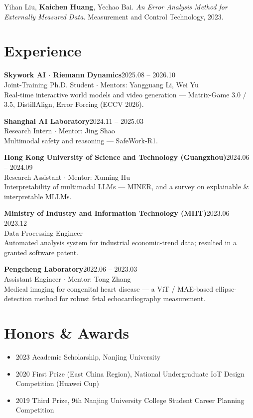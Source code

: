 \documentclass[11pt]{article}
\newcommand{\me}{\textbf{Kaichen Huang}}
\newcommand{\dt}[1]{\hfill{\color{inkIII}\footnotesize #1}}
\newcommand{\entry}[4]{%
  \textbf{\color{ink}#1}\dt{#2}\\[1pt]
  {\color{inkII}\small #3}\\[1pt]
  {\color{inkII}\small #4}\par\vspace{5pt}}
\newcounter{pubc}
\newcommand{\pub}[3]{%
  \stepcounter{pubc}%
  \noindent[\arabic{pubc}]\hspace{4pt}\begingroup\small
  #1. \textit{#2}. {\color{venue}#3}.\endgroup\par\vspace{4pt}}
\begin{document}
\pub{Yihan Liu, \me, Yechao Bai}{An Error Analysis Method for Externally Measured Data}{Measurement and Control Technology, 2023}

\section*{Experience}
\entry{Skywork AI \normalfont$\cdot$ Riemann Dynamics}{2025.08 -- 2026.10}
{Joint-Training Ph.D. Student \textcolor{inkIII}{$\cdot$} Mentors: Yangguang Li, Wei Yu}
{Real-time interactive world models and video generation --- Matrix-Game 3.0 / 3.5, DistillAlign, Error Forcing (ECCV 2026).}

\entry{Shanghai AI Laboratory}{2024.11 -- 2025.03}
{Research Intern \textcolor{inkIII}{$\cdot$} Mentor: Jing Shao}
{Multimodal safety and reasoning --- SafeWork-R1.}

\entry{Hong Kong University of Science and Technology (Guangzhou)}{2024.06 -- 2024.09}
{Research Assistant \textcolor{inkIII}{$\cdot$} Mentor: Xuming Hu}
{Interpretability of multimodal LLMs --- MINER, and a survey on explainable \& interpretable MLLMs.}

\entry{Ministry of Industry and Information Technology (MIIT)}{2023.06 -- 2023.12}
{Data Processing Engineer}
{Automated analysis system for industrial economic-trend data; resulted in a granted software patent.}

\entry{Pengcheng Laboratory}{2022.06 -- 2023.03}
{Assistant Engineer \textcolor{inkIII}{$\cdot$} Mentor: Tong Zhang}
{Medical imaging for congenital heart disease --- a ViT / MAE-based ellipse-detection method for robust fetal echocardiography measurement.}

\section*{Honors \& Awards}
\begin{itemize}
  \item[] {\color{inkIII}\footnotesize 2023}\hspace{6pt} Academic Scholarship, Nanjing University
  \item[] {\color{inkIII}\footnotesize 2020}\hspace{6pt} First Prize (East China Region), National Undergraduate IoT Design Competition (Huawei Cup)
  \item[] {\color{inkIII}\footnotesize 2019}\hspace{6pt} Third Prize, 9th Nanjing University College Student Career Planning Competition
\end{itemize}
\end{document}
